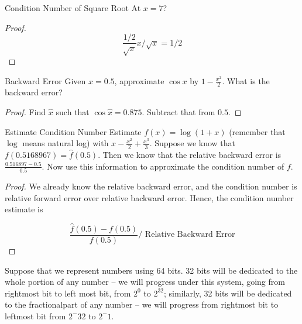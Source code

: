 \documentclass[../main.tex]{subfiles}
\begin{document}
\begin{problem}{Condition Number of Square Root}
    At $x = 7$?
\end{problem}
\begin{proof}
    \[
        \frac{1/2}{\sqrt{x}}x \bigg/ \sqrt{x} = 1/2
    \]
\end{proof}

\begin{problem}{Backward Error}
    Given $x = 0.5$, approximate $\cos x$ by $1 - \frac{x^2}{2}$.
    What is the backward error?
\end{problem}

\begin{proof}
    Find $\hat{x}$ such that $\cos \hat{x} = 0.875$. Subtract that
    from $0.5$.
\end{proof}

\begin{problem}{Estimate Condition Number}
    Estimate $f(x) = \log(1 + x)$ (remember that $\log$ means natural
    log) with $x - \frac{x^2}{2} + \frac{x^3}{3}$. Suppose we know that
    $f(0.5168967) = \hat{f}(0.5)$. Then we know that the relative backward
    error is $\frac{0.516897 - 0.5}{0.5}$. Now use this information
    to approximate the condition number of $f$.
\end{problem}

\begin{proof}
    We already know the relative backward error, and the condition number is relative forward error over relative backward error. Hence, the
    condition number estimate is

    \[
        \frac{\hat{f}(0.5) - f(0.5)}{f(0.5)} \bigg/ \text{ Relative Backward Error}
    \]
\end{proof}


\begin{definition}
    Suppose that we represent numbers using 64 bits. 32 bits will be dedicated to the whole portion of any number -- we will progress under this system, going from rightmost bit to left most bit, from $2^0$ to $2^32$; similarly, 32 bits will be dedicated to the fractionalpart of any number -- we will progress from rightmost bit to leftmost bit from $2^-32$ to $2^-1$.
\end{definition}
\end{document}
